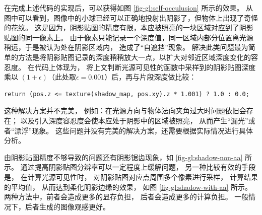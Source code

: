 \documentclass[fontset=windows]{ctexart}
\begin{document}
在完成上述代码的实现后，可以获得如图 \ref{fig-gl:self-occulusion} 所示的效果。
从图中可以看到，图像中的小球已经可以正确地投射出阴影了，但物体上出现了奇怪的花纹。
这是因为，阴影贴图的精度有限，本应被照亮的一块区域对应到了阴影贴图的同一像素上。
由于像素只能记录一个深度值，同一区域内部分位置离光源稍远，于是被认为处在阴影区域内，
造成了“自遮挡”现象。
解决此类问题最为简单的方法是将阴影贴图记录的深度稍稍放大一点，以扩大对邻近区域深度变化的容忍度。
在代码上体现为，
将上文判断光源可见性的函数中采样到的阴影贴图深度乘以
$(1+\epsilon)$（此处取$\epsilon=0.001$）后，再与片段深度做比较：

\begin{lstlisting}
return (pos.z <= texture(shadow_map, pos.xy).z * 1.001) ? 1.0 : 0.0;
\end{lstlisting}

这种解决方案并不完美，
例如：在光源方向与物体法向夹角过大时问题依旧会存在；
以及引入深度容忍度会使本应处于阴影中的区域被照亮，
从而产生“漏光”或者“漂浮”现象。
这些问题并没有完美的解决方案，还需要根据实际情况进行具体分析。

由阴影贴图精度不够导致的问题还有阴影锯齿现象，如 \ref{fig-gl:shadow-non-aa} 所示。
通过提高阴影贴图分辨率可以一定程度上缓解问题，
另一种比较有效的手段是，
在计算光源可见性时，
对阴影贴图对应点周围多个像素进行采样，
计算结果的平均值，
从而达到柔化阴影边缘的效果，
如图 \ref{fig-gl:shadow-with-aa} 所示。
两种方法中，前者会造成更多的显存负担，
后者会造成更多的计算负担。
一般情况下，后者生成的图像观感更好。
\end{document}
